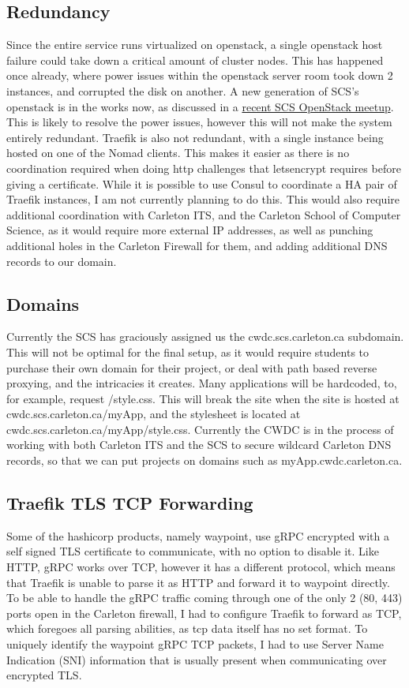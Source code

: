 \documentclass{article}
\begin{document}
\subsection{Redundancy}
Since the entire service runs virtualized on openstack, a single openstack host failure could take down a critical amount of cluster nodes. This has happened once already, where power issues within the openstack server room took down 2 instances, and corrupted the disk on another. A new generation of SCS's openstack is in the works now, as discussed in a \href{https://youtu.be/BxaVBn-YVFc}{recent SCS OpenStack meetup}. This is likely to resolve the power issues, however this will not make the system entirely redundant. Traefik is also not redundant, with a single instance being hosted on one of the Nomad clients. This makes it easier as there is no coordination required when doing http challenges that letsencrypt requires before giving a certificate. While it is possible to use Consul to coordinate a HA pair of Traefik instances, I am not currently planning to do this. This would also require additional coordination with Carleton ITS, and the Carleton School of Computer Science, as it would require more external IP addresses, as well as punching additional holes in the Carleton Firewall for them, and adding additional DNS records to our domain.

\subsection{Domains}
Currently the SCS has graciously assigned us the cwdc.scs.carleton.ca subdomain. This will not be optimal for the final setup, as it would require students to purchase their own domain for their project, or deal with path based reverse proxying, and the intricacies it creates. Many applications will be hardcoded, to, for example, request /style.css. This will break the site when the site is hosted at cwdc.scs.carleton.ca/myApp, and the stylesheet is located at cwdc.scs.carleton.ca/myApp/style.css. Currently the CWDC is in the process of working with both Carleton ITS and the SCS to secure wildcard Carleton DNS records, so that we can put projects on domains such as myApp.cwdc.carleton.ca.

\subsection{Traefik TLS TCP Forwarding}
Some of the hashicorp products, namely waypoint, use gRPC encrypted with a self signed TLS certificate to communicate, with no option to disable it. Like HTTP, gRPC works over TCP, however it has a different protocol, which means that Traefik is unable to parse it as HTTP and forward it to waypoint directly. To be able to handle the gRPC traffic coming through one of the only 2 (80, 443) ports open in the Carleton firewall, I had to configure Traefik to forward as TCP, which foregoes all parsing abilities, as tcp data itself has no set format. To uniquely identify the waypoint gRPC TCP packets, I had to use Server Name Indication (SNI) information that is usually present when communicating over encrypted TLS. 
\end{document}

